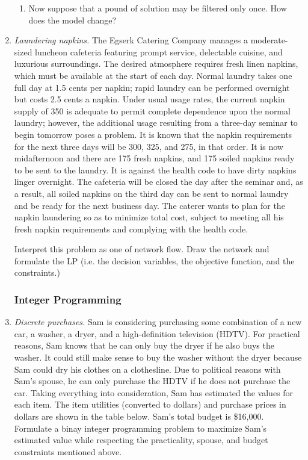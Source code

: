 \begin{enumerate}
\begin{enumerate}
	\item Now suppose that a pound of solution may
	be filtered only once. How does the model
	change?
\end{enumerate}


\item \emph{Laundering napkins.} The Egserk Catering Company manages a
  moderate-sized luncheon cafeteria featuring prompt service,
  delectable cuisine, and luxurious surroundings. The desired
  atmosphere requires fresh linen napkins, which must be available at
  the start of each day. Normal laundry takes one full day at 1.5
  cents per napkin; rapid laundry can be performed overnight but costs
  2.5 cents a napkin. Under usual usage rates, the current napkin
  supply of 350 is adequate to permit complete dependence upon the
  normal laundry; however, the additional usage resulting from a
  three-day seminar to begin tomorrow poses a problem. It is known
  that the napkin requirements for the next three days will be 300,
  325, and 275, in that order. It is now midafternoon and there are
  175 fresh napkins, and 175 soiled napkins ready to be sent to the
  laundry. It is against the health code to have dirty napkins linger
  overnight. The cafeteria will be closed the day after the seminar
  and, as a result, all soiled napkins on the third day can be sent to
  normal laundry and be ready for the next business day.  The caterer
  wants to plan for the napkin laundering so as to minimize total
  cost, subject to meeting all his fresh napkin requirements and
  complying with the health code.

  Interpret this problem as one of network flow.  Draw the network and
  formulate the LP (i.e. the decision variables, the objective
  function, and the constraints.)

\subsubsection*{Integer Programming}
\item \emph{Discrete purchases.} Sam is considering purchasing some
  combination of a new car, a washer, a dryer, and a high-definition
  television (HDTV). For practical reasons, Sam knows that he can only
  buy the dryer if he also buys the washer. It could still make sense
  to buy the washer without the dryer because Sam could dry his
  clothes on a clothesline. Due to political reasons with Sam's
  spouse, he can only purchase the HDTV if he does not purchase the
  car. Taking everything into consideration, Sam has estimated the
  values for each item. The item utilities (converted to dollars) and
  purchase prices in dollars are shown in the table below.  Sam's
  total budget is \$16,000. Formulate a binay integer programming
  problem to maximize Sam's estimated value while respecting the
  practicality, spouse, and budget constraints mentioned above.


\end{enumerate}
